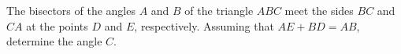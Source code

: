 The bisectors of the angles $A$ and $B$ of the triangle $ABC$ meet the sides $BC$ and $CA$ at the points $D$ and $E$,  respectively. Assuming that $AE+BD=AB$,  determine the angle $C$.
